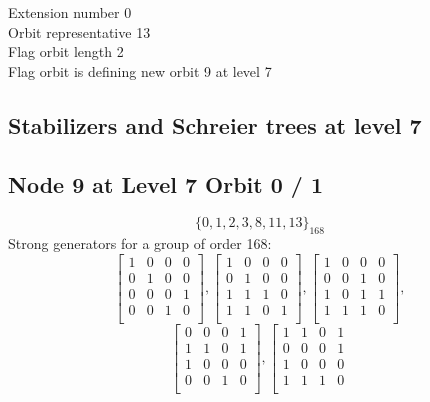 \noindent Extension number 0\\
Orbit representative 13\\
Flag orbit length 2\\
Flag orbit is defining new orbit 9 at level 7\\

\subsection{Stabilizers and Schreier trees at level 7}

\subsection*{Node 9 at Level 7 Orbit 0 / 1}
$$
\{ 0, 1, 2, 3, 8, 11, 13 \}_{168}$$
{\small\arraycolsep=2pt
Strong generators for a group of order 168:
$$
\left[
\begin{array}{*{4}{r}}
1 & 0 & 0 & 0\\
0 & 1 & 0 & 0\\
0 & 0 & 0 & 1\\
0 & 0 & 1 & 0\\
\end{array}
\right]
, 
\left[
\begin{array}{*{4}{r}}
1 & 0 & 0 & 0\\
0 & 1 & 0 & 0\\
1 & 1 & 1 & 0\\
1 & 1 & 0 & 1\\
\end{array}
\right]
, 
\left[
\begin{array}{*{4}{r}}
1 & 0 & 0 & 0\\
0 & 0 & 1 & 0\\
1 & 0 & 1 & 1\\
1 & 1 & 1 & 0\\
\end{array}
\right]
, 
$$
$$
\left[
\begin{array}{*{4}{r}}
0 & 0 & 0 & 1\\
1 & 1 & 0 & 1\\
1 & 0 & 0 & 0\\
0 & 0 & 1 & 0\\
\end{array}
\right]
, 
\left[
\begin{array}{*{4}{r}}
1 & 1 & 0 & 1\\
0 & 0 & 0 & 1\\
1 & 0 & 0 & 0\\
1 & 1 & 1 & 0\\

\end{array}$$}
